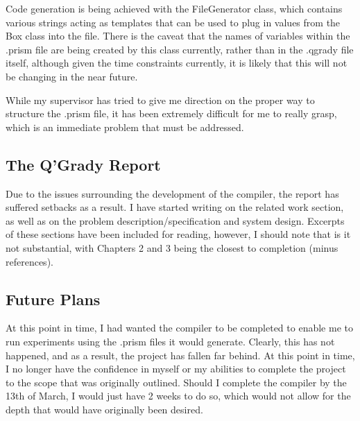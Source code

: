 \documentclass[report.tex]{subfiles}
\begin{document}
Code generation is being achieved with the FileGenerator class, which contains
various strings acting as templates that can be used to plug in values from
the Box class into the file. There is the caveat that the names of variables
within the .prism file are being created by this class currently, rather than
in the .qgrady file itself, although given the time constraints currently, it is
likely that this will not be changing in the near future.

While my supervisor has tried to give me direction on the proper way to
structure the .prism file, it has been extremely difficult for me to really
grasp, which is an immediate problem that must be addressed.

\subsection{The Q'Grady Report} %
\label{sub:the_q_grady_report}
Due to the issues surrounding the development of the compiler, the report has
suffered setbacks as a result. I have started writing on the related work
section, as well as on the problem description/specification and system design.
Excerpts of these sections have been included for reading, however, I should
note that is it not substantial, with Chapters 2 and 3 being the closest to
completion (minus references).

\subsection{Future Plans} %
\label{sub:future_plans}
At this point in time, I had wanted the compiler to be completed to enable me to
run experiments using the .prism files it would generate. Clearly, this has not
happened, and as a result, the project has fallen far behind. At this point in
time, I no longer have the confidence in myself or my abilities to complete the
project to the scope that was originally outlined. Should I complete the
compiler by the 13th of March, I would just have 2 weeks to do so, which would
not allow for the depth that would have originally been desired.

\newpage
\end{document}
